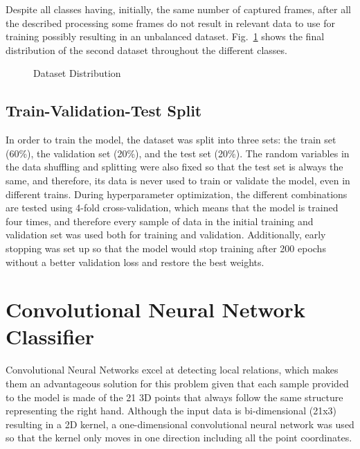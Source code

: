 Despite all classes having, initially, the same number of captured frames, after all the described processing some frames do not result in relevant data to use for training possibly resulting in an unbalanced dataset. Fig.~\ref{fig:dataset2_distribution} shows the final distribution of the second dataset throughout the different classes.

\begin{figure}[H]
    \centering
    {\fontsize{10}{12}\selectfont}
    \caption[Dataset Distribution]{Dataset Distribution}
    \label{fig:dataset2_distribution}
\end{figure}

\subsection{Train-Validation-Test Split}

In order to train the model, the dataset was split into three sets: the train set (60\%), the validation set (20\%), and the test set (20\%). The random variables in the data shuffling and splitting were also fixed so that the test set is always the same, and therefore, its data is never used to train or validate the model, even in different trains. During hyperparameter optimization, the different combinations are tested using 4-fold cross-validation, which means that the model is trained four times, and therefore every sample of data in the initial training and validation set was used both for training and validation. Additionally, early stopping was set up so that the model would stop training after 200 epochs without a better validation loss and restore the best weights.

\section{Convolutional Neural Network Classifier}
\label{section:cnn_classifier}

Convolutional Neural Networks excel at detecting local relations, which makes them an advantageous solution for this problem given that each sample provided to the model is made of the 21 3D points that always follow the same structure representing the right hand. Although the input data is bi-dimensional (21x3) resulting in a 2D kernel, a one-dimensional convolutional neural network was used so that the kernel only moves in one direction including all the point coordinates.


